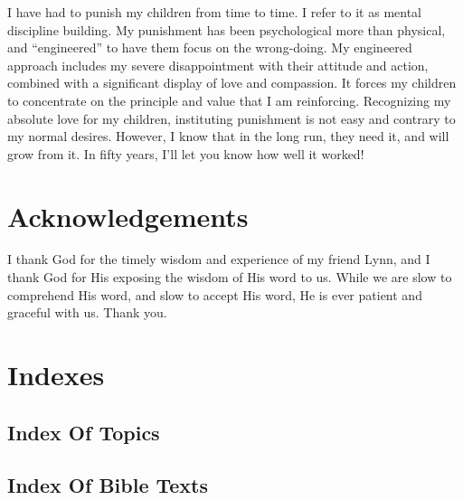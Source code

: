 \documentclass[12pt]{memoir}
\begin{document}
I have had to punish my children from time to time.
I refer to it as mental discipline building.
My punishment has been psychological more than physical, and ``engineered'' to have them focus on the wrong-doing.
My engineered approach includes my severe disappointment with their attitude and action, combined with a significant display of love and compassion.
It forces my children to concentrate on the principle and value that I am reinforcing.
Recognizing my absolute love for my children, instituting punishment is not easy and contrary to my normal desires.
However, I know that in the long run, they need it, and will grow from it.
In fifty years, I'll let you know how well it worked!

\backmatter

\chapter{Acknowledgements}

I thank God for the timely wisdom and experience of my friend Lynn, and I thank God for His exposing the wisdom of His word to us.
While we are slow to comprehend His word, and slow to accept His word, He is ever patient and graceful with us. Thank you.


\chapter{Indexes}

\section{Index Of Topics}

\vspace{-3em}\renewcommand\indexname{}
\printindex

\clearpage

\section{Index Of Bible Texts}

\printindex[gen]
\printindex[exo]
\printindex[lev]
\printindex[num]
\printindex[deu]
\printindex[jos]
\printindex[jdg]
\printindex[rut]
\printindex[1sa]
\printindex[2sa]
\printindex[1ki]
\printindex[2ki]
\printindex[1ch]
\printindex[2ch]
\printindex[ezr]
\printindex[neh]
\printindex[est]
\printindex[job]
\printindex[psa]
\printindex[pro]
\printindex[ecc]
\printindex[son]
\printindex[isa]
\printindex[jer]
\printindex[lam]
\printindex[eze]
\printindex[dan]
\printindex[hos]
\printindex[joe]
\printindex[amo]
\printindex[oba]
\printindex[jon]
\printindex[mic]
\printindex[nah]
\printindex[hab]
\printindex[zep]
\printindex[hag]
\printindex[zec]
\printindex[mal]
\printindex[mat]
\printindex[mar]
\printindex[luk]
\printindex[joh]
\printindex[act]
\printindex[rom]
\printindex[1co]
\printindex[2co]
\printindex[gal]
\printindex[eph]
\printindex[phi]
\printindex[col]
\printindex[1th]
\printindex[2th]
\printindex[1ti]
\printindex[2ti]
\printindex[tit]
\printindex[phm]
\printindex[heb]
\printindex[jam]
\printindex[1pe]
\printindex[2pe]
\printindex[1jo]
\printindex[2jo]
\printindex[3jo]
\printindex[jud]
\printindex[rev]

\cleardoublepage
\end{document}
